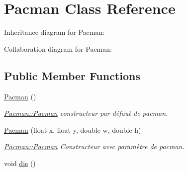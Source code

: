 \hypertarget{class_pacman}{}\section{Pacman Class Reference}
\label{class_pacman}


Inheritance diagram for Pacman\+:


Collaboration diagram for Pacman\+:
\subsection*{Public Member Functions}
\begin{DoxyCompactItemize}
\item 
\hypertarget{class_pacman_a499408baab38f119ebd4f41e90fbe3fe}{}\hyperlink{class_pacman_a499408baab38f119ebd4f41e90fbe3fe}{Pacman} ()\label{class_pacman_a499408baab38f119ebd4f41e90fbe3fe}

\begin{DoxyCompactList}\small\item\em \hyperlink{class_pacman_a499408baab38f119ebd4f41e90fbe3fe}{Pacman\+::\+Pacman} constructeur par défaut de pacman. \end{DoxyCompactList}\item 
\hyperlink{class_pacman_a459aba0fb8132acea8d96cd391b3e007}{Pacman} (float x, float y, double w, double h)
\begin{DoxyCompactList}\small\item\em \hyperlink{class_pacman_a499408baab38f119ebd4f41e90fbe3fe}{Pacman\+::\+Pacman} Constructeur avec paramètre de pacman. \end{DoxyCompactList}\item 
\hypertarget{class_pacman_a880f3f899b2f2d1ee9969fa049f7289d}{}void \hyperlink{class_pacman_a880f3f899b2f2d1ee9969fa049f7289d}{die} ()\label{class_pacman_a880f3f899b2f2d1ee9969fa049f7289d}


\end{DoxyCompactItemize}
